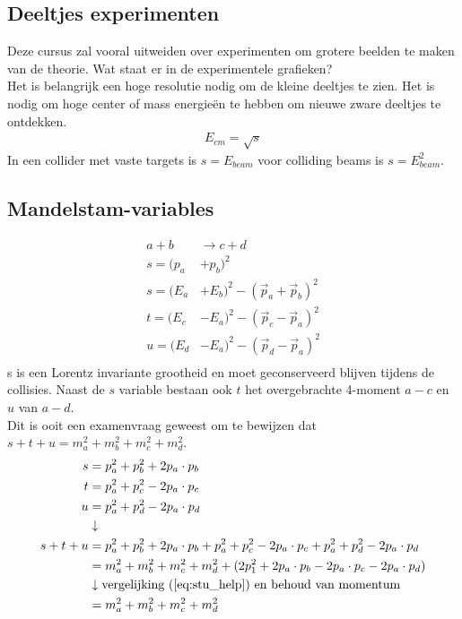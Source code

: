 \documentclass[../main.tex]{subfiles}
\begin{document}
\subsection{Deeltjes experimenten}%
\label{sub:deeltjes_experimenten}

Deze cursus zal vooral uitweiden over experimenten om grotere beelden te maken van de theorie. Wat staat er in de experimentele grafieken?\\
Het is belangrijk een hoge resolutie nodig om de kleine deeltjes te zien. Het is nodig om hoge center of mass energieën te hebben om nieuwe zware deeltjes te ontdekken.
\begin{equation}
    \begin{aligned}
        \label{eq:E_cm}
        E_{cm} = \sqrt{s}
    \end{aligned}
\end{equation}
In een collider met vaste targets is $s=E_{beam}$ voor colliding beams is $s=E_{beam}^2$.

\subsection{Mandelstam-variables}%
\label{sub:mandelstam_variables}

\begin{equation}
    \begin{aligned}
        \label{eq:mandelstam}
        a+b&\rightarrow c+d\\
        s=(p_a&+p_b)^2\\
        s=(E_a&+E_b)^2-(\vec{p}_a + \vec{p}_b)^2\\
        t=(E_c&-E_a)^2-(\vec{p}_c - \vec{p}_a)^2\\
        u=(E_d&-E_a)^2-(\vec{p}_d - \vec{p}_a)^2\\
    \end{aligned}
\end{equation}
s is een Lorentz invariante grootheid en moet geconserveerd blijven tijdens de collisies. Naast de $s$ variable bestaan ook $t$ het overgebrachte 4-moment $a-c$ en $u$ van $a-d$.\\
Dit is ooit een examenvraag geweest om te bewijzen dat $s+t+u=m_a^2+m_b^2+m_c^2+m_d^2$.
\begin{equation}
    \begin{aligned}
        \label{eq:stu_bewijs}
        s&=p_a^2+p_b^2+2p_a\cdot p_b\\
        t&=p_a^2+p_c^2-2p_a\cdot p_c\\
        u&=p_a^2+p_d^2-2p_a\cdot p_d\\
         &\downarrow\\
        s+t+u&=p_a^2+p_b^2+2p_a\cdot p_b + p_a^2+p_c^2-2p_a\cdot p_c + p_a^2+p_d^2-2p_a\cdot p_d\\
             &=m_a^2+m_b^2+m_c^2+m_d^2+(2p_1^2+2p_a\cdot p_b-2p_a\cdot p_c-2p_a\cdot p_d)\\
             &\downarrow \text{vergelijking (\ref{eq:stu_help}) en behoud van momentum}\\
             &=m_a^2+m_b^2+m_c^2+m_d^2
    \end{aligned}
\end{equation}
\end{document}
